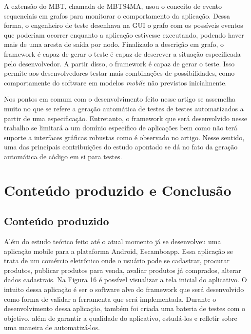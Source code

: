 \documentclass[
    12pt,       %
    openright,      %
    twoside,      %
    a4paper,      %
    english,      %
    french,       %
    spanish,      %
    brazil,       %
    ]{abntex2}
\begin{document}
      A extensão do MBT, chamada de MBTS4MA, usou o conceito de evento sequenciais em grafos para monitorar
      o comportamento da aplicação. Dessa forma, o engenheiro de teste desenhava na GUI o grafo com os
      possíveis eventos que poderiam ocorrer enquanto a aplicação estivesse executando, podendo haver mais
      de uma aresta de saída por nodo. Finalizado a descrição em grafo, o framework é capaz de gerar o teste
      é capaz de descrever a situação especificada pelo desenvolvedor. A partir disso, o framework é capaz
      de gerar o teste. Isso permite aos desenvolvedores testar mais combinações de possibilidades, como
      comportamente do software em modelos \textit{mobile} não previstos inicialmente.

      Nos pontos em comum com o desenvolvimento feito nesse artigo se assemelha muito no que se refere a
      geração automática de testes de testes automatizados a partir de uma especificação. Entretanto, o
      framework que será desenvolvido nesse trabalho se limitará a um domínio específico de aplicações bem
      como não terá suporte a interfaces gráficas robustas como é observado no artigo. Nesse sentido, uma
      das principais contribuições do estudo apontado se dá no fato da geração automática de código em si
      para testes.

  \part{Conteúdo produzido e Conclusão}

  \chapter{Conteúdo produzido}
    Além do estudo teórico feito até o atual momento já se desenvolveu uma aplicação mobile para a plataforma
    Android, Escamboapp. Essa aplicação se trata de um comércio eletrônico onde o usuário pode se cadastrar,
    procurar produtos, publicar produtos para venda, avaliar produtos já comprados, alterar dados cadastrais.
    Na Figura 16 é possível visualizar a tela inicial do aplicativo. O intuito dessa aplicação é ser o
    software alvo do framework que será desenvolvido como forma de validar a ferramenta que será implementada.
    Durante o desenvolvimento dessa aplicação, também foi criada uma bateria de testes com o objetivo, além
    de garantir a qualidade do aplicativo, estudá-los e refletir sobre uma maneira de automatizá-los.
\end{document}
